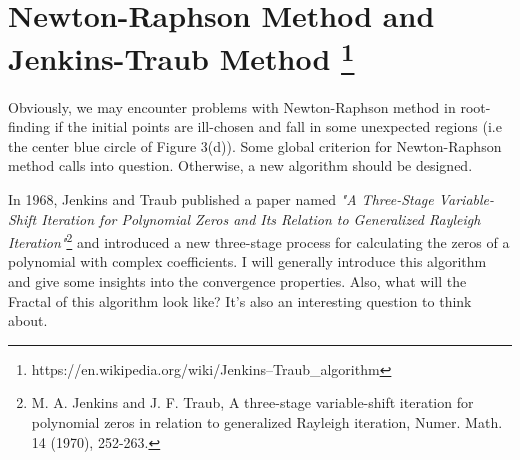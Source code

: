 \documentclass[11pt]{article}
\begin{document}
\section{Newton-Raphson Method and Jenkins-Traub Method \footnote{https://en.wikipedia.org/wiki/Jenkins–Traub\_algorithm}}
Obviously, we may encounter problems with Newton-Raphson method in root-finding if the initial points are ill-chosen and fall in some unexpected regions (i.e the center blue circle of Figure 3(d)). Some global criterion for Newton-Raphson method calls into question. Otherwise, a new algorithm should be designed.

In 1968, Jenkins and Traub published a paper named \textit{"A Three-Stage Variable-Shift Iteration for Polynomial Zeros and Its Relation to Generalized Rayleigh Iteration"}\footnote{M. A. Jenkins and J. F. Traub, A three-stage variable-shift iteration for polynomial zeros in relation to generalized Rayleigh iteration, Numer. Math. 14 (1970), 252-263.} and introduced a new three-stage process for calculating the zeros of a 
polynomial with complex coefficients. I will generally introduce this algorithm and give some insights into the convergence properties. Also, what will the Fractal of this algorithm look like? It's also an interesting question to think about.
\end{document}
